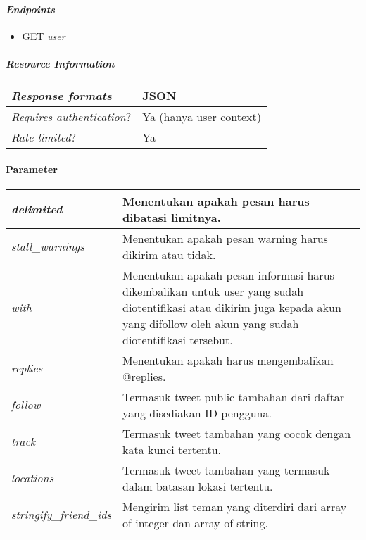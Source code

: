 \paragraph{\textit{Endpoints}}
\begin{itemize}
	\item GET \textit{user}
\end{itemize}

\paragraph{\textit{Resource Information}}
\begin{table}[h]
\begin{tabular}{|l|l|}
\hline
\textit{Response formats}         & JSON                    \\ \hline
\textit{Requires authentication}? & Ya (hanya user context) \\ \hline
\textit{Rate limited}?            & Ya                    \\ \hline
\end{tabular}
\end{table}

\paragraph{Parameter}
\begin{table}[h]
\begin{tabular}{|l|l|}
\hline
\textit{delimited}              & Menentukan apakah pesan harus dibatasi limitnya.																												\\ \hline
\textit{stall\_warnings}        & Menentukan apakah pesan warning harus dikirim atau tidak.                                                               \\ \hline
\textit{with}                   & Menentukan apakah pesan informasi harus dikembalikan untuk user yang sudah diotentifikasi atau dikirim juga kepada akun yang difollow oleh akun yang sudah diotentifikasi tersebut.\\ \hline
\textit{replies}                & Menentukan apakah harus mengembalikan @replies.                                                                             \\ \hline
\textit{follow}                 & Termasuk tweet public tambahan dari daftar yang disediakan ID pengguna.														\\ \hline
\textit{track}                  & Termasuk tweet tambahan yang cocok dengan kata kunci tertentu.     \\ \hline
\textit{locations}              & Termasuk tweet tambahan yang termasuk dalam batasan lokasi tertentu.                                                      \\ \hline
\textit{stringify\_friend\_ids} & Mengirim list teman yang diterdiri dari array of integer dan array of string.              \\ \hline            
\end{tabular}
\end{table}

